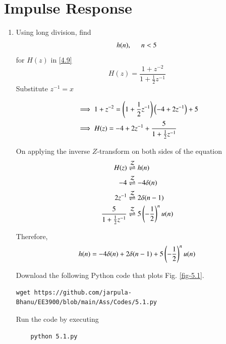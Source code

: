 \documentclass[journal,12pt,twocolumn]{IEEEtran}
\renewcommand\thesection{\arabic{section}}
\begin{document}
\section{Impulse Response}

\begin{enumerate}[label=\thesection.\arabic*
,ref=\thesection.\theenumi]
\item Using long division, find 
\begin{align}
	h(n) , \hspace*{5mm} n<5
\end{align}
for $H(z)$ in \ref{4.9}\\
\solution \begin{equation}
	H(z) = \frac{1 + z^{-2}}{1 + \frac{1}{2} z^{-1}}
\end{equation}
Substitute $z^{-1} = x$


\begin{align}
	&\implies 1 + z^{-2} = \left(1 + \frac{1}{2} z^{-1}\right)\left(-4 + 2z^{-1}\right) + 5 \\
	&\implies H(z) = -4 + 2z^{-1} + \frac{5}{1 + \frac{1}{2} z^{-1}}
\end{align}

On applying the inverse $Z$-transform on both sides of the equation
\begin{align}
	H(z) &\overset{\mathcal{Z}}{ \rightleftharpoons} h(n) \\
	-4 &\overset{\mathcal{Z}}{ \rightleftharpoons} -4\delta(n) \\
	2z^{-1} &\overset{\mathcal{Z}}{ \rightleftharpoons} 2\delta(n - 1) \\
	\frac{5}{1 + \frac{1}{2} z^{-1}} &\overset{\mathcal{Z}}{ \rightleftharpoons} 5\left(-\frac{1}{2}\right)^n u(n) \\
\end{align}

Therefore,
\begin{equation}
	h(n) = -4\delta(n) + 2\delta(n - 1) + 5\left(-\frac{1}{2}\right)^n u(n)
\end{equation}

Download the following Python code that plots Fig. \ref{fig-5.1}.
\begin{lstlisting}
wget https://github.com/jarpula-Bhanu/EE3900/blob/main/Ass/Codes/5.1.py
\end{lstlisting}

Run the code by executing
\begin{lstlisting}
	python 5.1.py
\end{lstlisting}


\end{enumerate}
\end{document}
